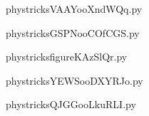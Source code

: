     

    \clearpage
    


    \newcommand{\CaptionFigVAAYooXndWQq}{<+Type your caption here+>}
    \begin{center}
        
    \end{center}
    phystricksVAAYooXndWQq.py

    

    \clearpage
    


    \newcommand{\CaptionFigGSPNooCOfCGS}{<+Type your caption here+>}
    \begin{center}
        
    \end{center}
    phystricksGSPNooCOfCGS.py

    

    \clearpage
    


    \newcommand{\CaptionFigfigureKAzSlQr}{<+Type your caption here+>}
    \begin{center}
        
    \end{center}
    phystricksfigureKAzSlQr.py

    

    \clearpage
    


    \newcommand{\CaptionFigYEWSooDXYRJo}{<+Type your caption here+>}
    \begin{center}
        
    \end{center}
    phystricksYEWSooDXYRJo.py

    

    \clearpage
    


    \newcommand{\CaptionFigQJGGooLkuRLI}{<+Type your caption here+>}
    \begin{center}
        
    \end{center}
    phystricksQJGGooLkuRLI.py

    

    \clearpage
    


